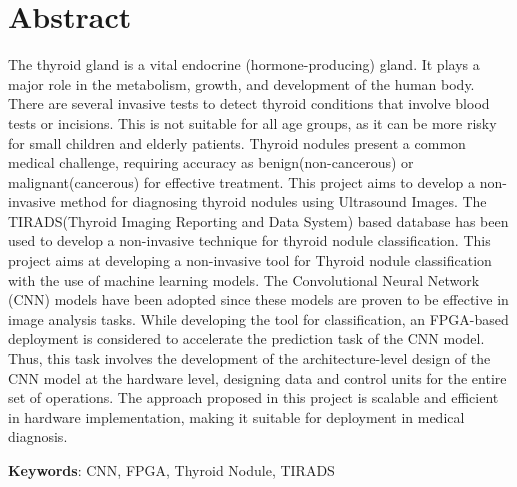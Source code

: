\thispagestyle{plain}

\chapter*{Abstract}

\vspace{2\baselineskip}
\begin{justify}
\noindent
The thyroid gland is a vital endocrine (hormone-producing) gland. It plays a major role in the metabolism, growth, and development of the human body. There are several invasive tests to detect thyroid conditions that involve blood tests or incisions. This is not suitable for all age groups, as it can be more risky for small children and elderly patients. Thyroid nodules present a common medical challenge, requiring accuracy as benign(non-cancerous) or malignant(cancerous) for effective treatment. This project aims to develop a non-invasive method for diagnosing thyroid nodules using Ultrasound Images. The TIRADS(Thyroid Imaging Reporting and Data System) based database has been used to develop a non-invasive technique for thyroid nodule classification. This project aims at developing a non-invasive tool for Thyroid nodule classification with the use of machine learning models. The Convolutional Neural Network (CNN) models have been adopted since these models are proven to be effective in image analysis tasks. While developing the tool for classification, an FPGA-based deployment is considered to accelerate the prediction task of the CNN model. Thus, this task involves the development of the architecture-level design of the CNN model at the hardware level, designing data and control units for the entire set of operations. The approach proposed in this project is scalable and efficient in hardware implementation, making it suitable for deployment in medical diagnosis.
\vspace{1.5\baselineskip}

\noindent
\textbf{Keywords}: CNN, FPGA, Thyroid Nodule, TIRADS
\end{justify}